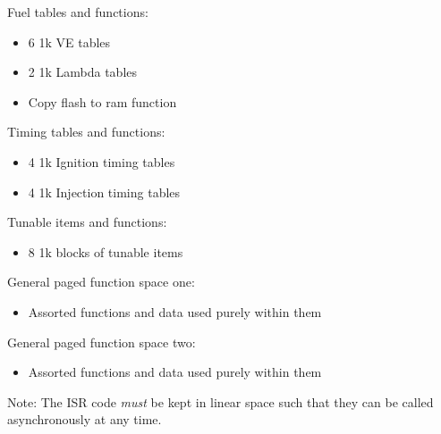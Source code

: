 \documentclass[12pt,a4paper,titlepage]{article}
\begin{document}
Fuel tables and functions:
\begin{itemize}
\item 6 1k VE tables
\item 2 1k Lambda tables
\item Copy flash to ram function
\end{itemize}

Timing tables and functions:
\begin{itemize}
\item 4 1k Ignition timing tables
\item 4 1k Injection timing tables
\end{itemize}

Tunable items and functions:
\begin{itemize}
\item 8 1k blocks of tunable items
\end{itemize}

General paged function space one:
\begin{itemize}
\item Assorted functions and data used purely within them
\end{itemize}

General paged function space two:
\begin{itemize}
\item Assorted functions and data used purely within them
\end{itemize}

Note: The ISR code \emph{must} be kept in linear space such that they can be
called asynchronously at any time.
\end{document}
